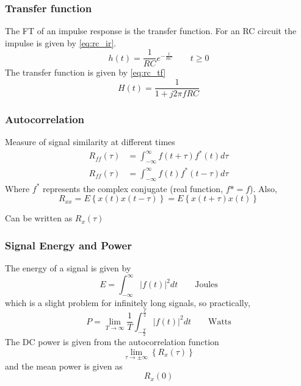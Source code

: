 \documentclass[a4paper,twocolumn]{article}
\newcommand{\infint}{ \int_{-\infty}^{\infty}}
\begin{document}
			\subsubsection{Transfer function}
				The FT of an impulse response is the transfer function.
				For an RC circuit the impulse  is given by \cref{eq:rc_ir}.
				\begin{equation}
					h(t) = \frac{1}{RC}e^{-\frac{t}{RC}} \qquad t\ge 0 \label{eq:rc_ir}
				\end{equation}
				The transfer function is given by \cref{eq:rc_tf}
				\begin{equation}
					H(t) = \frac{1}{1+j2\pi f RC}\label{eq:rc_tf}
				\end{equation}
			\subsubsection{Autocorrelation}
				Measure of signal similarity at different times
				\begin{align}
					R_{ff}(\tau) &= \infint f(t+\tau)f^\ast(t) d\tau \\
					R_{ff}(\tau) &= \infint f(t)f^\ast(t-\tau) d\tau
				\end{align}
				Where $f^\ast$ represents the complex conjugate (real function, $f\ast = f$).
				Also,
				\begin{equation}
					R_{xx} = E \left\{ x(t)x(t-\tau) \right\}=E \left\{x(t+\tau)x(t)\right\}
				\end{equation}

				Can be written as $R_x(\tau)$
			\subsubsection{Signal Energy and Power}
				The energy of a signal is given by
				\begin{equation}
					E = \infint \left| f(t)\right|^2 dt \qquad \mathrm{Joules}
				\end{equation}
				which is a slight problem for infinitely long signals, so practically,
				\begin{equation}
					P =\lim_{T \to \infty} \frac{1}{T} \int^{\frac{T}{2}}_{-\frac{T}{2}} 
					\left| f(t)\right|^2 dt \qquad \mathrm{Watts}
				\end{equation}
				The DC power is given from the autocorrelation function
				\begin{equation}
					\lim_{\tau \to \pm\infty}\left\{ R_{x}(\tau) \right\}
				\end{equation}
				and the mean power is given as
				\[R_x(0)\]
\end{document}
